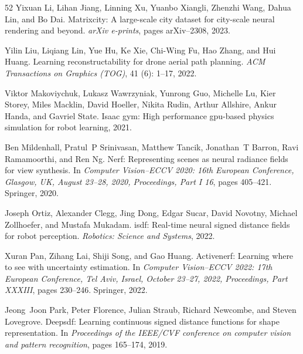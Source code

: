 \documentclass[10pt,twocolumn,letterpaper]{article}
\begin{document}
{\begin{thebibliography}{52}
Yixuan Li, Lihan Jiang, Linning Xu, Yuanbo Xiangli, Zhenzhi Wang, Dahua Lin, and Bo Dai.
\newblock Matrixcity: A large-scale city dataset for city-scale neural rendering and beyond.
\newblock \emph{arXiv e-prints}, pages arXiv--2308, 2023.

Yilin Liu, Liqiang Lin, Yue Hu, Ke Xie, Chi-Wing Fu, Hao Zhang, and Hui Huang.
\newblock Learning reconstructability for drone aerial path planning.
\newblock \emph{ACM Transactions on Graphics (TOG)}, 41 (6): 1--17, 2022.

Viktor Makoviychuk, Lukasz Wawrzyniak, Yunrong Guo, Michelle Lu, Kier Storey, Miles Macklin, David Hoeller, Nikita Rudin, Arthur Allshire, Ankur Handa, and Gavriel State.
\newblock Isaac gym: High performance gpu-based physics simulation for robot learning, 2021.

Ben Mildenhall, Pratul~P Srinivasan, Matthew Tancik, Jonathan~T Barron, Ravi Ramamoorthi, and Ren Ng.
\newblock Nerf: Representing scenes as neural radiance fields for view synthesis.
\newblock In \emph{Computer Vision--ECCV 2020: 16th European Conference, Glasgow, UK, August 23--28, 2020, Proceedings, Part I 16}, pages 405--421. Springer, 2020.

Joseph Ortiz, Alexander Clegg, Jing Dong, Edgar Sucar, David Novotny, Michael Zollhoefer, and Mustafa Mukadam.
\newblock isdf: Real-time neural signed distance fields for robot perception.
\newblock \emph{Robotics: Science and Systems}, 2022.

Xuran Pan, Zihang Lai, Shiji Song, and Gao Huang.
\newblock Activenerf: Learning where to see with uncertainty estimation.
\newblock In \emph{Computer Vision--ECCV 2022: 17th European Conference, Tel Aviv, Israel, October 23--27, 2022, Proceedings, Part XXXIII}, pages 230--246. Springer, 2022.

Jeong~Joon Park, Peter Florence, Julian Straub, Richard Newcombe, and Steven Lovegrove.
\newblock Deepsdf: Learning continuous signed distance functions for shape representation.
\newblock In \emph{Proceedings of the IEEE/CVF conference on computer vision and pattern recognition}, pages 165--174, 2019.


\end{thebibliography}}
\end{document}
